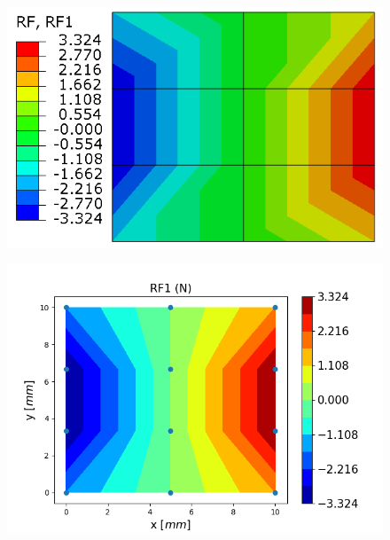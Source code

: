 \documentclass[11pt]{article}
\begin{document}
\begin{figure}[H]
	\centering
	\begin{minipage}{.5\textwidth}
		\centering
		\includegraphics[width=1\linewidth]{EM23RF1.png}
		\label{EM23RF1}
	\end{minipage}%
	\begin{minipage}{.6\textwidth}
		\centering
		\includegraphics[width=1\linewidth]{EM23RF1_IGA.png}
		\label{EM23RF1_IGA}
	\end{minipage}
\end{figure}
\end{document}
